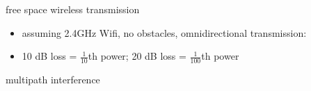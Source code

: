 \begin{frame}{free space wireless transmission}
\begin{itemize}
\item assuming 2.4GHz Wifi, no obstacles, omnidirectional transmission:
\item 10 dB loss = $\frac{1}{10}$th power; 20 dB loss = $\frac{1}{100}$th power
\end{itemize}
\end{frame}

\begin{frame}{multipath interference}
\end{frame}
